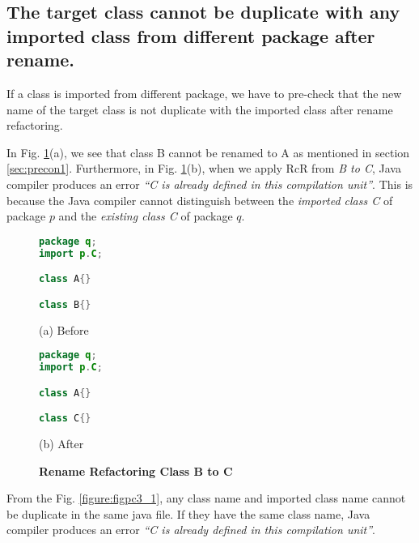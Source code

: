 \subsection{The target class cannot be duplicate with any imported class from different package after rename.}

If a class is imported from different package, we have to pre-check that the new name of the target class is not duplicate with the imported class after rename refactoring. 

In Fig. \ref{figure:fig2}(a), we see that class B cannot be renamed to A as mentioned in section \ref{sec:precon1}. Furthermore, in Fig. \ref{figure:fig2}(b), when we apply RcR from \emph{B to C}, Java compiler produces an error \textit{``C is already defined in this compilation unit''}. This is because the Java compiler cannot distinguish between the \emph{imported class C} of package $p$ and the \emph{existing class C} of package $q$. 

\begin{figure}[th]
\centering
\begin{minipage}[t]{0.4\linewidth}
\begin{lstlisting}[language=java, basicstyle=\scriptsize\ttfamily,frame=single]
package q;
import p.C;

class A{}

class B{} 
\end{lstlisting}
\centering(a) Before
\end{minipage}
\hfill
\begin{minipage}[t]{0.4\linewidth}
\begin{lstlisting}[language=java, basicstyle=\scriptsize\ttfamily,frame=single]
package q;
import p.C;

class A{}

class C{} 
\end{lstlisting}
\centering(b) After
\end{minipage}
\caption{\textbf{Rename Refactoring Class B to C}}
\label{figure:fig2}
\end{figure}


From the Fig. \ref{figure:figpc3_1}, any class name and imported class name cannot be duplicate in the same java file. If they have the same class name, Java compiler produces an error \textit{``C is already defined in this compilation unit''}.  

